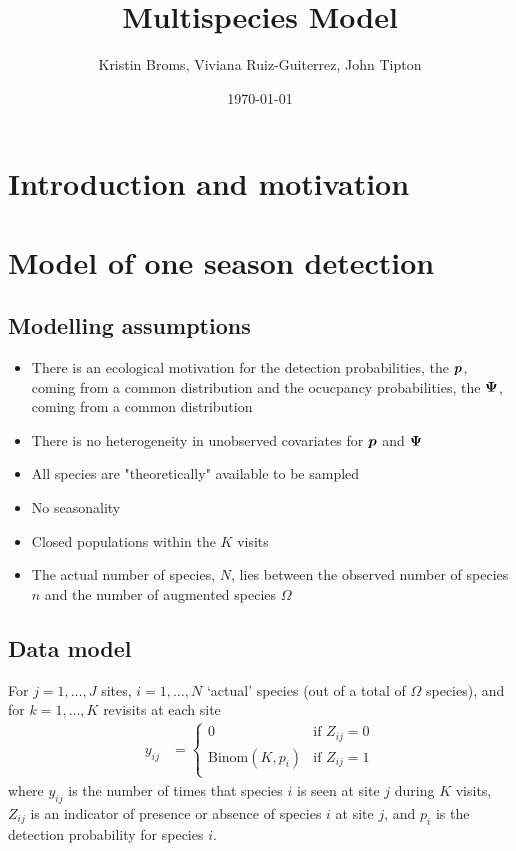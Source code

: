 \documentclass[fleqn]{article}
\title{Multispecies Model}
\author{Kristin Broms, Viviana Ruiz-Guiterrez, John Tipton}
\date{\today}
\def\bm#1{\mbox{\boldmath $#1$}}
\begin{document}
%
\maketitle
%
\section{Introduction and motivation}
%
\section{Model of one season detection}
%
\subsection{Modelling assumptions}
%
\begin{itemize}
  \item There is an ecological motivation for the detection probabilities, the $\bm{p}$, coming from a common distribution and the ocucpancy probabilities, the $\bm{\Psi}$, coming from a common distribution
  \item There is no heterogeneity in unobserved covariates for $\bm{p}$ and $\bm{\Psi}$
  \item All species are "theoretically" available to be sampled
  \item No seasonality
  \item Closed populations within the $K$ visits
  \item The actual number of species, $N$, lies between the observed number of species $n$ and the number of augmented species $\Omega$
\end{itemize}
%
\subsection{Data model}
%
For $j = 1, \ldots, J$ sites,  $i = 1, \ldots, N$ `actual' species (out of a total of $\Omega$ species), and for $k = 1, \ldots, K$ revisits at each site
%
\begin{align*}
  y_{ij} & = 
    \begin{cases}
      0 & \mbox{if } Z_{ij} = 0\\
      \mbox{Binom}(K, p_i) & \mbox{if } Z_{ij} = 1\\
    \end{cases}
\end{align*}
%
where $y_{ij}$ is the number of times that species $i$ is seen at site $j$ during $K$ visits, $Z_{ij}$ is an indicator of presence or absence of species $i$ at site $j$, and $p_i$ is the detection probability for species $i$.
%
\end{document}

